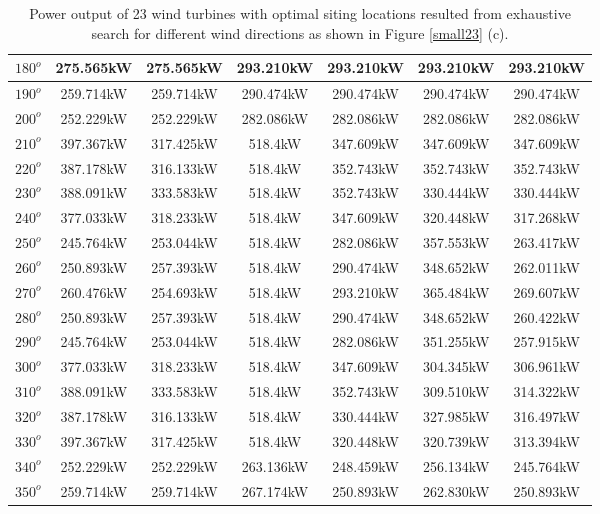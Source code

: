 \begin{table}[H]
\begin{tabular}{|c|c|c|c|c|c|c|}
		$180^o$	& 275.565kW	& 275.565kW	& 293.210kW	& 293.210kW	& 293.210kW	& 293.210kW	\\ \hline
		$190^o$	& 259.714kW	& 259.714kW	& 290.474kW	& 290.474kW	& 290.474kW	& 290.474kW	\\ \hline
		$200^o$	& 252.229kW	& 252.229kW	& 282.086kW	& 282.086kW	& 282.086kW	& 282.086kW	\\ \hline
		$210^o$	& 397.367kW	& 317.425kW	& 518.4kW	& 347.609kW	& 347.609kW	& 347.609kW	\\ \hline
		$220^o$	& 387.178kW	& 316.133kW	& 518.4kW	& 352.743kW	& 352.743kW	& 352.743kW	\\ \hline
		$230^o$	& 388.091kW	& 333.583kW	& 518.4kW	& 352.743kW	& 330.444kW	& 330.444kW	\\ \hline
		$240^o$	& 377.033kW	& 318.233kW	& 518.4kW	& 347.609kW	& 320.448kW	& 317.268kW	\\ \hline
		$250^o$	& 245.764kW	& 253.044kW	& 518.4kW	& 282.086kW	& 357.553kW	& 263.417kW	\\ \hline
		$260^o$	& 250.893kW	& 257.393kW	& 518.4kW	& 290.474kW	& 348.652kW	& 262.011kW	\\ \hline
		$270^o$	& 260.476kW	& 254.693kW	& 518.4kW	& 293.210kW	& 365.484kW	& 269.607kW	\\ \hline
		$280^o$	& 250.893kW	& 257.393kW	& 518.4kW	& 290.474kW	& 348.652kW	& 260.422kW	\\ \hline
		$290^o$	& 245.764kW	& 253.044kW	& 518.4kW	& 282.086kW	& 351.255kW	& 257.915kW	\\ \hline
		$300^o$	& 377.033kW	& 318.233kW	& 518.4kW	& 347.609kW	& 304.345kW	& 306.961kW	\\ \hline
		$310^o$	& 388.091kW	& 333.583kW	& 518.4kW	& 352.743kW	& 309.510kW	& 314.322kW	\\ \hline
		$320^o$	& 387.178kW	& 316.133kW	& 518.4kW	& 330.444kW	& 327.985kW	& 316.497kW	\\ \hline
		$330^o$	& 397.367kW	& 317.425kW	& 518.4kW	& 320.448kW	& 320.739kW	& 313.394kW	\\ \hline
		$340^o$	& 252.229kW	& 252.229kW	& 263.136kW	& 248.459kW	& 256.134kW	& 245.764kW	\\ \hline
		$350^o$	& 259.714kW	& 259.714kW	& 267.174kW	& 250.893kW	& 262.830kW	& 250.893kW	\\ \hline
        	\end{tabular}
        	\caption{Power output of 23 wind turbines with optimal siting locations resulted from exhaustive search for different wind directions as shown in Figure \ref{small23} (c).}
        	\label{table23c}
        \end{table}
